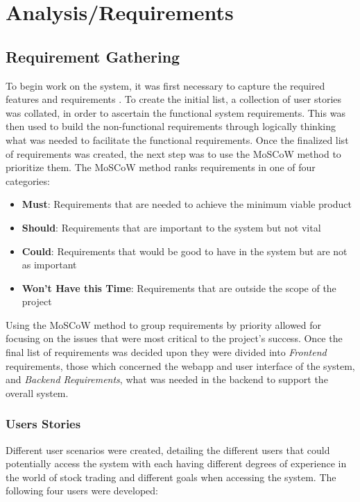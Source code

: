 \chapter{Analysis/Requirements}
\label{Analysis}

\section{Requirement Gathering}

To begin work on the system, it was first necessary to capture the required features and requirements \cite{Cooper_1998}. To create the initial list, a collection of user stories was collated, in order to ascertain the functional system requirements. This was then used to build the non-functional requirements through logically thinking what was needed to facilitate the functional requirements. Once the finalized list of requirements was created, the next step was to use the MoSCoW \citep{website:Moscow} method to prioritize them. The MoSCoW method ranks requirements in one of four categories:
    \begin{itemize}
        \item \textbf{Must}: Requirements that are needed to achieve the minimum viable product
        \item \textbf{Should}: Requirements that are important to the system but not vital
        \item \textbf{Could}: Requirements that would be good to have in the system but are not as important
        \item \textbf{Won't Have this Time}: Requirements that are outside the scope of the project
    \end{itemize}
Using the MoSCoW method to group requirements by priority allowed for focusing on the issues that were most critical to the project's success. Once the final list of requirements was decided upon they were divided into \textit{Frontend} requirements, those which concerned the webapp and user interface of the system, and \textit{Backend Requirements}, what was needed in the backend to support the overall system.
    
    \subsection{Users Stories}
    Different user scenarios were created, detailing the different users that could potentially access the system with each having different degrees of experience in the world of stock trading and different goals when accessing the system. The following four users were developed:
    
